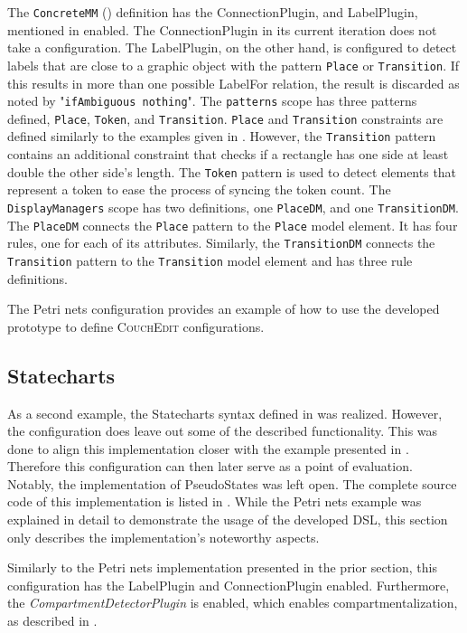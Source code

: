 The \texttt{ConcreteMM} () definition has the ConnectionPlugin, and LabelPlugin, mentioned in  enabled. The ConnectionPlugin in its current iteration does not take a configuration. The LabelPlugin, on the other hand, is configured to detect labels that are close to a graphic object with the pattern \texttt{Place} or \texttt{Transition}. If this results in more than one possible LabelFor relation, the result is discarded as noted by "\texttt{ifAmbiguous nothing}". The \texttt{patterns} scope has three patterns defined, \texttt{Place}, \texttt{Token}, and \texttt{Transition}. \texttt{Place} and \texttt{Transition} constraints are defined similarly to the examples given in . However, the \texttt{Transition} pattern contains an additional constraint that checks if a rectangle has one side at least double the other side's length.  The \texttt{Token} pattern is used to detect elements that represent a token to ease the process of syncing the token count. The \texttt{DisplayManagers} scope has two definitions, one \texttt{PlaceDM}, and one \texttt{TransitionDM}. The \texttt{PlaceDM} connects the \texttt{Place} pattern to the \texttt{Place} model element. It has four rules, one for each of its attributes. Similarly, the \texttt{TransitionDM} connects the \texttt{Transition} pattern to the \texttt{Transition} model element and has three rule definitions.

The Petri nets configuration provides an example of how to use the developed prototype to define \textsc{CouchEdit} configurations. 

\subsection{Statecharts}
\label{sec:state-impl}
As a second example, the Statecharts syntax defined in  was realized. However, the configuration does leave out some of the described functionality. This was done to align this implementation closer with the example presented in \cite{nachreiner_couchedit_2020}. Therefore this configuration can then later serve as a point of evaluation. Notably, the implementation of PseudoStates was left open. The complete source code of this implementation is listed in . While the Petri nets example was explained in detail to demonstrate the usage of the developed DSL, this section only describes the implementation's noteworthy aspects.

Similarly to the Petri nets implementation presented in the prior section, this configuration has the LabelPlugin and ConnectionPlugin enabled. Furthermore, the \emph{CompartmentDetectorPlugin} is enabled, which enables compartmentalization, as described in .

